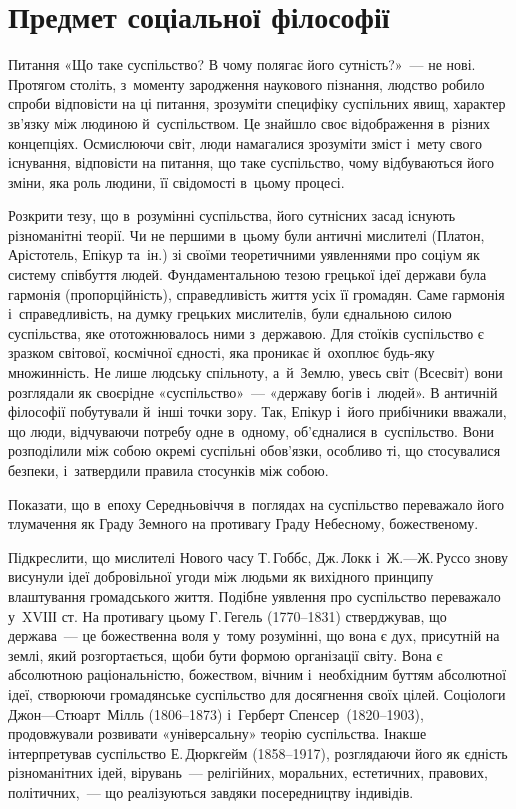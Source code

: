 \documentclass[a5paper,oneside,DIV=12,12pt,headings=small]{scrartcl}
\begin{document}
	\section{Предмет соціальної філософії}
		Питання «Що таке суспільство? В чому полягає його сутність?»~— не нові. Протягом століть, з~моменту зародження наукового пізнання, людство робило спроби відповісти на ці питання, зрозуміти специфіку суспільних явищ, характер зв'язку між людиною й~суспільством. Це знайшло своє відображення в~різних концепціях. Осмислюючи світ, люди намагалися зрозуміти зміст і~мету свого існування, відповісти на питання, що таке суспільство, чому відбуваються його зміни, яка роль людини, її свідомості в~цьому процесі.

		Розкрити тезу, що в~розумінні суспільства, його сутнісних засад існують різноманітні теорії. Чи не першими в~цьому були античні мислителі (Платон, Арістотель, Епікур та~ін.) зі своїми теоретичними уявленнями про соціум як систему співбуття людей. Фундаментальною тезою грецької ідеї держави була гармонія (пропорційність), справедливість життя усіх її громадян. Саме гармонія і~справедливість, на думку грецьких мислителів, були єднальною силою суспільства, яке ототожнювалось ними з~державою. Для стоїків суспільство є зразком світової, космічної єдності, яка проникає й~охоплює будь-яку множинність. Не лише людську спільноту, а~й~Землю, увесь світ (Всесвіт) вони розглядали як своєрідне «суспільство»~— «державу богів і~людей». В античній філософії побутували й~інші точки зору. Так, Епікур і~його прибічники вважали, що люди, відчуваючи потребу одне в~одному, об'єдналися в~суспільство. Вони розподілили між собою окремі суспільні обов'язки, особливо ті, що стосувалися безпеки, і~затвердили правила стосунків між собою.

		Показати, що в~епоху Середньовіччя в~поглядах на суспільство переважало його тлумачення як Граду Земного на противагу Граду Небесному, божественому.

		Підкреслити, що мислителі Нового часу Т.\,Гоббс, Дж.\,Локк і~Ж.—Ж.\,Руссо знову висунули ідеї добровільної угоди між людьми як вихідного принципу влаштування громадського життя. Подібне уявлення про суспільство переважало у~XVІІІ ст. На противагу цьому Г.\,Гегель (1770–1831) стверджував, що держава~— це божественна воля у~тому розумінні, що вона є дух, присутній на землі, який розгортається, щоби бути формою організації світу. Вона є абсолютною раціональністю, божеством, вічним і~необхідним буттям абсолютної ідеї, створюючи громадянське суспільство для досягнення своїх цілей. Соціологи Джон—Стюарт~Мілль (1806–1873) і~Герберт Спенсер~(1820–1903), продовжували розвивати «універсальну» теорію суспільства. Інакше інтерпретував суспільство Е.\,Дюркгейм (1858–1917), розглядаючи його як єдність різноманітних ідей, вірувань~— релігійних, моральних, естетичних, правових, політичних,~— що реалізуються завдяки посередництву індивідів.
\end{document}

